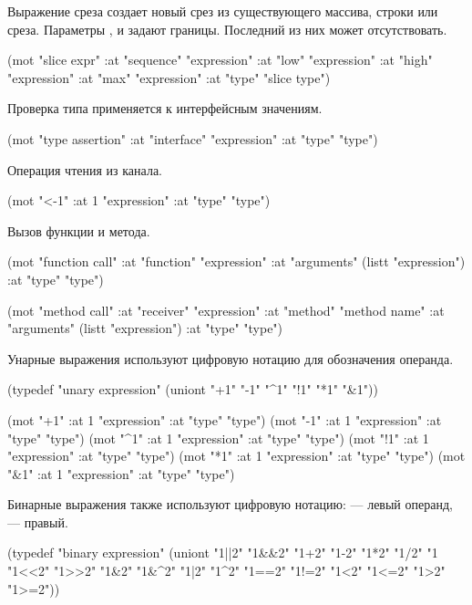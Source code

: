\documentclass[12pt,twoside,russian]{article}
\newcommand{\textABMLString}[1]{{\color{abmlString}#1}}
\newcommand{\ABMLString}[1]{\abmlinline{\textABMLString{#1}}}
\begin{document}
Выражение среза создает новый срез из существующего массива, строки или среза. Параметры \ABMLString{low}, \ABMLString{high} и \ABMLString{max} задают границы. Последний из них может отсутствовать.

\begin{ABMLCode}
(mot "slice expr" 
	:at "sequence" "expression"
	:at "low"      "expression" 
	:at "high"     "expression" 
	:at "max"      "expression"
	:at "type"     "slice type")
\end{ABMLCode}

Проверка типа применяется к интерфейсным значениям.

\begin{ABMLCode}
(mot "type assertion" :at "interface" "expression" :at "type" "type")
\end{ABMLCode}

Операция чтения из канала.

\begin{ABMLCode}
(mot "<-1" :at 1 "expression" :at "type" "type")
\end{ABMLCode}

Вызов функции и метода.

\begin{ABMLCode}
(mot "function call" :at "function" "expression" 
                     :at "arguments" (listt "expression")
                     :at "type" "type")

(mot "method call" :at "receiver" "expression" 
		   :at "method" "method name" 
                   :at "arguments" (listt "expression")
                   :at "type" "type")
\end{ABMLCode}

Унарные выражения используют цифровую нотацию для обозначения операнда.

\begin{ABMLCode}
(typedef "unary expression" (uniont "+1" "-1" "^1" "!1" "*1" "&1"))

(mot "+1" :at 1 "expression" :at "type" "type")
(mot "-1" :at 1 "expression" :at "type" "type")
(mot "^1" :at 1 "expression" :at "type" "type")
(mot "!1" :at 1 "expression" :at "type" "type")
(mot "*1" :at 1 "expression" :at "type" "type")
(mot "&1" :at 1 "expression" :at "type" "type")
\end{ABMLCode}

Бинарные выражения также используют цифровую нотацию: \ABMLString{1} — левый операнд, \ABMLString{2} — правый.

\begin{ABMLCode}
(typedef "binary expression" 
    (uniont "1||2" "1&&2" "1+2" "1-2" "1*2" "1/2" "1%
            "1<<2" "1>>2" "1&2" "1&^2"  "1|2" "1^2" 
            "1==2" "1!=2" "1<2" "1<=2" "1>2" "1>=2"))
\end{ABMLCode}
\end{document}
